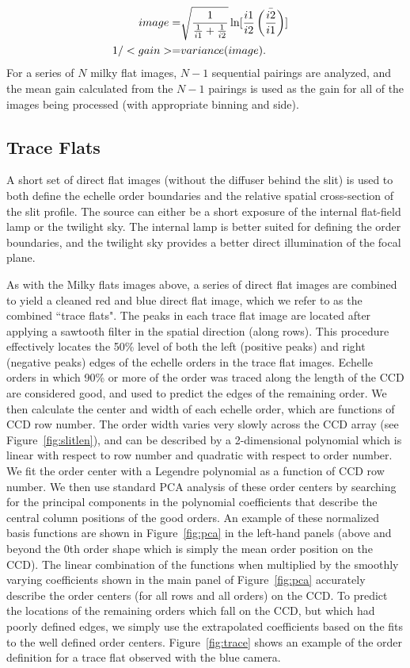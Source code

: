 \documentclass[12pt,preprint]{aastex}
\begin{document}
\begin{eqnarray}
image = & \sqrt{\frac{1}{\frac{1}{i1} + \frac{1}{i2}}} \, 
              {\rm ln}[\frac{i1}{i2} \, \bar{\left(\frac{i2}{i1}\right)}]  \cr
1 / <gain> = & variance(image) .
\end{eqnarray}
For a series of $N$ milky flat images, $N-1$ sequential pairings are analyzed,
and the mean gain calculated from the $N-1$ pairings is used as the gain 
for all of the images being processed (with appropriate binning and side).

\subsection{Trace Flats}
\label{sec:tflat}

A short set of direct flat images (without the diffuser behind the slit) is
used to both define the echelle order boundaries and the relative spatial
cross-section of the slit profile.  The source can either be a short
exposure of the internal flat-field lamp or the twilight sky.  
The internal lamp is better suited for defining the order boundaries, and
the twilight sky provides a better direct illumination of the focal plane.

As with the Milky flats images above, a series of direct flat images
are combined to yield a cleaned red and blue
direct flat image, which we refer to as the combined ``trace flats".
The peaks in each trace flat image are located after applying a sawtooth filter
in the spatial direction (along rows).  This procedure effectively locates
the 50\% level of both the left (positive peaks) and right (negative peaks)
edges of the echelle orders in the trace flat images.  Echelle orders in which
90\% or more of the order was traced along the length of the CCD are considered good, and used to predict the edges of the remaining order.  
We then calculate the center and width of each echelle order, which are
functions of CCD row number.
The order width varies very slowly across the
CCD array (see Figure~\ref{fig:slitlen}), and can be described by a 2-dimensional
polynomial which is linear with respect to row number and quadratic with 
respect to order number.  
We fit the order center with a Legendre polynomial as a function
of CCD row number. We then use standard
PCA analysis \citep{PCA} of these order centers 
by searching for the principal components in the 
polynomial coefficients that describe the central column positions of the 
good orders.  
An example of these normalized basis functions are shown in Figure~\ref{fig:pca} 
in the 
left-hand panels (above and beyond the 0th order shape which is simply the 
mean order position on the CCD).  The linear combination of the functions when
multiplied by the smoothly varying coefficients shown in the main panel of
Figure~\ref{fig:pca}
accurately describe the order centers (for all rows and all orders) on the CCD.
To predict the locations of the remaining orders which fall on the CCD, 
but which had poorly defined edges, we simply use the extrapolated
coefficients based on the fits to the well defined order centers.
Figure~\ref{fig:trace} shows an example of the order definition for
a trace flat observed with the blue camera.  
\end{document}
